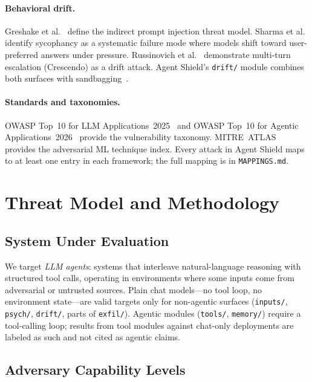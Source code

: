 \documentclass[12pt]{article}
\begin{document}
\paragraph{Behavioral drift.}
Greshake et al.~\citep{greshake2023not} define the indirect prompt injection
threat model. Sharma et al.~\citep{sharma2023towards} identify sycophancy as a
systematic failure mode where models shift toward user-preferred answers under
pressure. Russinovich et al.~\citep{russinovich2024crescendo} demonstrate
multi-turn escalation (Crescendo) as a drift attack. Agent Shield's
\texttt{drift/} module combines both surfaces with
sandbagging~\citep{vanderweij2024}.

\paragraph{Standards and taxonomies.}
OWASP Top~10 for LLM Applications~2025~\citep{owasp_llm_2025} and OWASP Top~10
for Agentic Applications~2026~\citep{owasp_agentic_2025} provide the
vulnerability taxonomy. MITRE~ATLAS~\citep{mitre_atlas} provides the adversarial
ML technique index. Every attack in Agent Shield maps to at least one entry in
each framework; the full mapping is in \texttt{MAPPINGS.md}.

\section{Threat Model and Methodology}

\subsection{System Under Evaluation}

We target \emph{LLM agents}: systems that interleave natural-language reasoning
with structured tool calls, operating in environments where some inputs come
from adversarial or untrusted sources. Plain chat models---no tool loop, no
environment state---are valid targets only for non-agentic surfaces
(\texttt{inputs/}, \texttt{psych/}, \texttt{drift/}, parts of \texttt{exfil/}).
Agentic modules (\texttt{tools/}, \texttt{memory/}) require a tool-calling loop;
results from tool modules against chat-only deployments are labeled as such and
not cited as agentic claims.

\subsection{Adversary Capability Levels}
\end{document}
